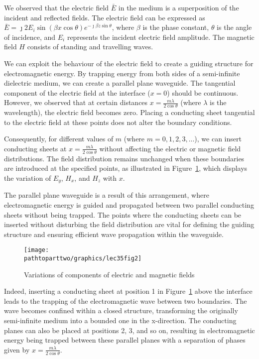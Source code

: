 We observed that the electric field $\bar{E}$ in the medium is a superposition of the incident and reflected fields. The electric field can be expressed as $\bar{E} = \jmath 2E_i\sin(\beta x\cos\theta)e^{-\jmath\beta z\sin\theta}$, where $\beta$ is the phase constant, $\theta$ is the angle of incidence, and $E_i$ represents the incident electric field amplitude. The magnetic field $H$ consists of standing and travelling waves.

We can exploit the behaviour of the electric field to create a guiding structure for electromagnetic energy. By trapping energy from both sides of a semi-infinite dielectric medium, we can create a parallel plane waveguide. The tangential component of the electric field at the interface ($x=0$) should be continuous. However, we observed that at certain distances $x=\frac{m\lambda}{2\cos\theta}$ (where $\lambda$ is the wavelength), the electric field becomes zero. Placing a conducting sheet tangential to the electric field at these points does not alter the boundary conditions.

Consequently, for different values of $m$ (where $m=0, 1, 2, 3, \ldots$), we can insert conducting sheets at $x=\frac{m\lambda}{2\cos\theta}$ without affecting the electric or magnetic field distributions. The field distribution remains unchanged when these boundaries are introduced at the specified points, as illustrated in Figure~\ref{fig:lec35fig2}, which displays the variation of $E_y$, $H_x$, and $H_z$ with $x$.

The parallel plane waveguide is a result of this arrangement, where electromagnetic energy is guided and propagated between two parallel conducting sheets without being trapped. The points where the conducting sheets can be inserted without disturbing the field distribution are vital for defining the guiding structure and ensuring efficient wave propagation within the waveguide.
\begin{figure}[h]
\centering
\texttt{[image: \\pathtoparttwo/graphics/lec35fig2]}
\caption{Variations of components of electric and magnetic fields}
\label{fig:lec35fig2}
\end{figure}

Indeed, inserting a conducting sheet at position 1 in Figure~\ref{fig:lec35fig2} above the interface leads to the trapping of the electromagnetic wave between two boundaries. The wave becomes confined within a closed structure, transforming the originally semi-infinite medium into a bounded one in the x-direction. The conducting planes can also be placed at positions 2, 3, and so on, resulting in electromagnetic energy being trapped between these parallel planes with a separation of phases given by $x=\frac{m\lambda}{2\cos\theta}$.

